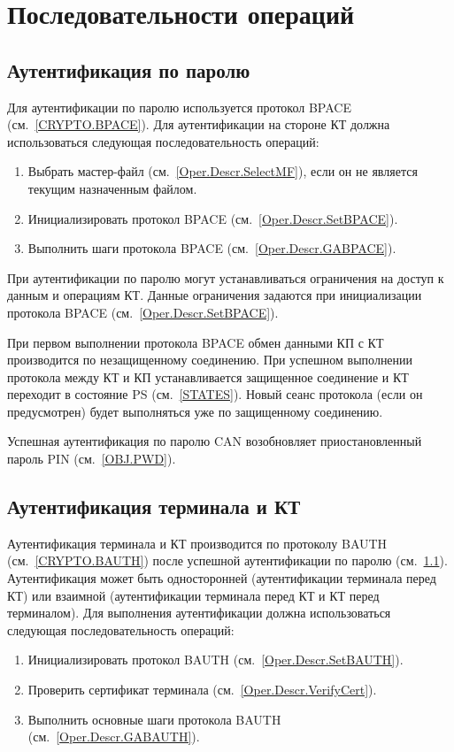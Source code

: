 \section{Последовательности операций}
\label{Oper.Seq}

\subsection{Аутентификация по паролю}
\label{Oper.Seq.BPACE}

Для аутентификации по паролю используется протокол BPACE 
(см.~\ref{CRYPTO.BPACE}). Для аутентификации на стороне КТ должна 
использоваться следующая последовательность операций:

\begin{enumerate}
\item Выбрать мастер-файл (см.~\ref{Oper.Descr.SelectMF}), 
если он не является текущим назначенным файлом.

\item Инициализировать протокол BPACE (см.~\ref{Oper.Descr.SetBPACE}).

\item Выполнить шаги протокола BPACE (см.~\ref{Oper.Descr.GABPACE}).
\end{enumerate}

При аутентификации по паролю могут устанавливаться ограничения 
на доступ к данным и операциям КТ.
Данные ограничения задаются при инициализации 
протокола BPACE (см.~\ref{Oper.Descr.SetBPACE}).

При первом выполнении протокола BPACE обмен данными КП с КТ производится 
по незащищенному соединению. При успешном выполнении протокола между КТ и 
КП устанавливается защищенное соединение и КТ переходит в состояние PS
(см.~\ref{STATES}). Новый сеанс протокола (если он 
предусмотрен) будет выполняться уже по защищенному соединению. 

Успешная аутентификация по паролю CAN возобновляет приостановленный 
пароль PIN (см.~\ref{OBJ.PWD}).

\subsection{Аутентификация терминала и КТ}
\label{Oper.Seq.BAUTH}

Аутентификация терминала и КТ производится по протоколу BAUTH 
(см.~\ref{CRYPTO.BAUTH}) после успешной аутентификации по паролю 
(см.~\ref{Oper.Seq.BPACE}). Аутентификация может быть односторонней 
(аутентификации терминала перед КТ) или взаимной (аутентификации терминала 
перед КТ и КТ перед терминалом). Для выполнения аутентификации должна 
использоваться следующая последовательность операций:
%
\begin{enumerate}
\item Инициализировать протокол BAUTH (см.~\ref{Oper.Descr.SetBAUTH}).
\item Проверить сертификат терминала (см.~\ref{Oper.Descr.VerifyCert}).
\item Выполнить основные шаги протокола BAUTH (см.~\ref{Oper.Descr.GABAUTH}).
\end{enumerate}

